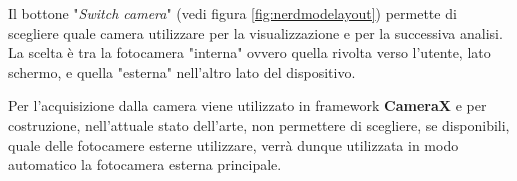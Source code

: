 Il bottone "\textit{Switch camera}" (vedi figura \ref{fig:nerdmodelayout}) permette di scegliere quale camera utilizzare per la visualizzazione e per la successiva analisi. La scelta è tra la fotocamera "interna" ovvero quella rivolta verso l'utente, lato schermo, e quella "esterna" nell'altro lato del dispositivo.

Per l'acquisizione dalla camera viene utilizzato in framework \textbf{CameraX}\cite{camerax_overview} e per costruzione, nell'attuale stato dell'arte, non permettere di scegliere, se disponibili, quale delle fotocamere esterne utilizzare, verrà dunque utilizzata in modo automatico la fotocamera esterna principale.